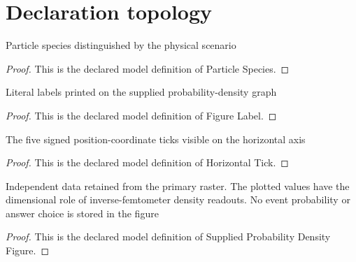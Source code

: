\section{Declaration topology}
\begin{definition}
  \label{def:physics:phyx-mini-0503:phyxminiproblems-problemphyxmini0503-particlespecies}
  Particle species distinguished by the physical scenario
\end{definition}
\begin{proof}
  This is the declared model definition of Particle Species.
\end{proof}
\begin{definition}
  \label{def:physics:phyx-mini-0503:phyxminiproblems-problemphyxmini0503-figurelabel}
  Literal labels printed on the supplied probability-density graph
\end{definition}
\begin{proof}
  This is the declared model definition of Figure Label.
\end{proof}
\begin{definition}
  \label{def:physics:phyx-mini-0503:phyxminiproblems-problemphyxmini0503-horizontaltick}
  The five signed position-coordinate ticks visible on the horizontal axis
\end{definition}
\begin{proof}
  This is the declared model definition of Horizontal Tick.
\end{proof}
\begin{definition}
  \label{def:physics:phyx-mini-0503:phyxminiproblems-problemphyxmini0503-suppliedprobabilitydensityfigure}
  Independent data retained from the primary raster. The plotted values have the dimensional role of inverse-femtometer density readouts. No event probability or answer choice is stored in the figure
\end{definition}
\begin{proof}
  This is the declared model definition of Supplied Probability Density Figure.
\end{proof}
